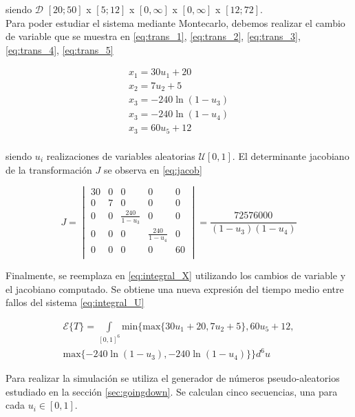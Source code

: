 \documentclass{sig-alternate}
\begin{document}
siendo $\mathcal{D}$ $[20;50]$ x $[5;12]$ x $[0,\infty]$ x $[0,\infty]$ x $[12;72]$. \\

Para poder estudiar el sistema mediante Montecarlo, debemos realizar el cambio
de variable que se muestra en \eqref{eq:trans_1}, \eqref{eq:trans_2},
\eqref{eq:trans_3}, \eqref{eq:trans_4}, \eqref{eq:trans_5}

\begin{eqnarray}
	\label{eq:trans_1}
	x_1 = 30 u_1 + 20 \\
	\label{eq:trans_2}
	x_2 = 7 u_2 + 5 \\
	\label{eq:trans_3}
	x_3 = - 240 \ln (1 - u_3) \\
	\label{eq:trans_4}
	x_3 = - 240 \ln (1 - u_4) \\
	\label{eq:trans_5}
	x_3 = 60 u_5 + 12 \\
\end{eqnarray}

siendo $u_i$ realizaciones de variables aleatorias $\mathcal{U}[0,1]$.
El determinante jacobiano de la transformaci\'on $J$ se observa en \eqref{eq:jacob}

\begin{equation}
\label{eq:jacob}
J =
\begin{vmatrix}
  30 & 0 & 0 & 0 & 0 \\
  0 & 7 & 0 & 0 & 0 \\
  0 & 0 & \frac{240}{1 - u_3} & 0 & 0 \\
  0 & 0 & 0 & \frac{240}{1 - u_4} & 0 \\
  0 & 0 & 0 & 0 & 60 \\
\end{vmatrix}
=
\frac {72576000}{(1 - u_3)(1 - u_4)}
\end{equation}

Finalmente, se reemplaza en \eqref{eq:integral_X} utilizando los cambios
de variable y el jacobiano computado. Se obtiene una nueva expresi\'on
del tiempo medio entre fallos del sistema \eqref{eq:integral_U}

\begin{eqnarray}
\label{eq:integral_U}
\mathcal{E} \{ T \} =	\int\limits_{[0,1]^6} \mathrm{min} 
\{ \mathrm{max}\{ 30 u_1 + 20, 7 u_2 + 5\} , 60 u_5 + 12,
\nonumber
\\
\mathrm{max}\{ -240 \ln ( 1 - u_3 ) , -240 \ln ( 1 - u_4 ) \} \} d^6u
\end{eqnarray}

Para realizar la simulaci\'on se utiliza el generador de n\'umeros
pseudo-aleatorios estudiado en la secci\'on \ref{sec:goingdown}. Se calculan
cinco secuencias, una para cada $u_i \in [0,1]$.
\end{document}
